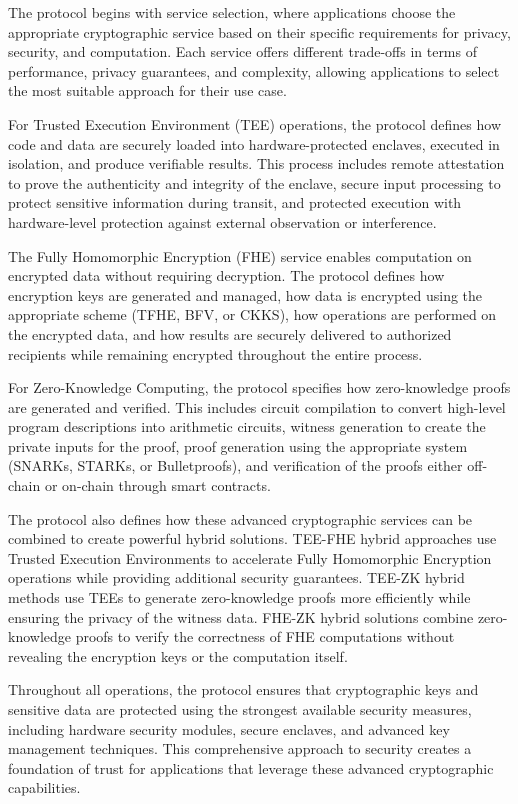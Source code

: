 \documentclass[12pt,a4paper]{article}
\begin{document}
The protocol begins with service selection, where applications choose the appropriate cryptographic service based on their specific requirements for privacy, security, and computation. Each service offers different trade-offs in terms of performance, privacy guarantees, and complexity, allowing applications to select the most suitable approach for their use case.

For Trusted Execution Environment (TEE) operations, the protocol defines how code and data are securely loaded into hardware-protected enclaves, executed in isolation, and produce verifiable results. This process includes remote attestation to prove the authenticity and integrity of the enclave, secure input processing to protect sensitive information during transit, and protected execution with hardware-level protection against external observation or interference.

The Fully Homomorphic Encryption (FHE) service enables computation on encrypted data without requiring decryption. The protocol defines how encryption keys are generated and managed, how data is encrypted using the appropriate scheme (TFHE, BFV, or CKKS), how operations are performed on the encrypted data, and how results are securely delivered to authorized recipients while remaining encrypted throughout the entire process.

For Zero-Knowledge Computing, the protocol specifies how zero-knowledge proofs are generated and verified. This includes circuit compilation to convert high-level program descriptions into arithmetic circuits, witness generation to create the private inputs for the proof, proof generation using the appropriate system (SNARKs, STARKs, or Bulletproofs), and verification of the proofs either off-chain or on-chain through smart contracts.

The protocol also defines how these advanced cryptographic services can be combined to create powerful hybrid solutions. TEE-FHE hybrid approaches use Trusted Execution Environments to accelerate Fully Homomorphic Encryption operations while providing additional security guarantees. TEE-ZK hybrid methods use TEEs to generate zero-knowledge proofs more efficiently while ensuring the privacy of the witness data. FHE-ZK hybrid solutions combine zero-knowledge proofs to verify the correctness of FHE computations without revealing the encryption keys or the computation itself.

Throughout all operations, the protocol ensures that cryptographic keys and sensitive data are protected using the strongest available security measures, including hardware security modules, secure enclaves, and advanced key management techniques. This comprehensive approach to security creates a foundation of trust for applications that leverage these advanced cryptographic capabilities.
\end{document}

